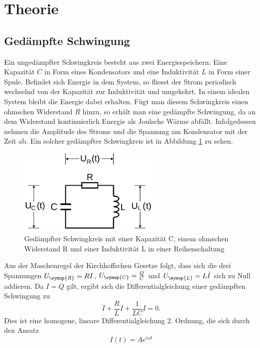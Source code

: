 \section{Theorie}
\label{sec:Theorie}
\subsection{Gedämpfte Schwingung}
Ein ungedämpfter Schwingkreis besteht aus zwei Energiespeichern: Eine Kapazität $C$
in Form eines Kondensators und eine Induktivität $L$ in Form einer Spule. Befindet
sich Energie in dem System, so fliesst der Strom periodisch wechselnd von der
Kapazität zur Induktivität und umgekehrt. In einem idealen System bleibt die Energie
dabei erhalten.
Fügt man diesem Schwingkreis einen ohmschen Widerstand $R$ hinzu, so erhält man eine
gedämpfte Schwingung, da an dem Widerstand kontinuierlich Energie als Joulsche Wärme
abfällt. Infolgedessen nehmen die Amplitude des Stroms und die Spannung am
Kondensator mit der Zeit ab. Ein solcher gedämpfter Schwingkreis ist in Abbildung
\ref{fig:gedaempfter_schwingkreis} zu sehen.
\begin{figure}
  \centering
  \includegraphics[width=0.6\textwidth]{gedaempfter_schwingkreis.png}
  \caption{Gedämpfter Schwingkreis mit einer Kapazität C, einem ohmschen Widerstand R
  und einer Induktivität L in einer Reihenschaltung \cite{sample}}
  \label{fig:gedaempfter_schwingkreis}
\end{figure}
Aus der Maschenregel der Kirchhoffschen Gesetze folgt, dass sich die drei Spannungen
$U_\symup{R} = R I$, $U_\symup{C} = \frac{Q}{C}$ und $U_\symup{L} = L \dot{I}$
sich zu Null addieren. Da $I=\dot{Q}$ gilt, ergibt sich die Differentialgleichung
einer gedämpften Schwingung zu
\begin{equation}
  \ddot{I} + \frac{R}{L}\dot{I} + \frac{1}{L C} I = 0.
  \label{eqn:dgl1}
\end{equation}
Dies ist eine homogene, lineare Differentialgleichung 2. Ordnung, die sich durch
den Ansatz
\begin{equation}
  I(t) = A e^{i \omega t}
  \label{eqn:ansatz}
\end{equation}
